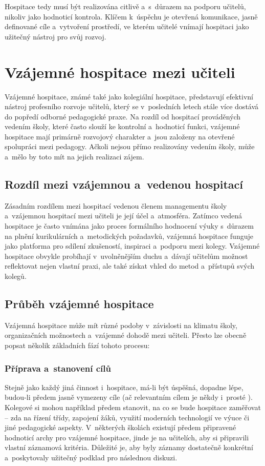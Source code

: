 Hospitace tedy musí být realizována citlivě a~s~důrazem na podporu učitelů, nikoliv jako hodnoticí kontrola. Klíčem k~úspěchu je otevřená komunikace, jasně definované cíle a~vytvoření prostředí, ve kterém učitelé vnímají hospitaci jako užitečný nástroj pro svůj rozvoj.

\section{Vzájemné hospitace mezi učiteli}
Vzájemné hospitace, známé také jako kolegiální hospitace, představují efektivní nástroj profesního rozvoje učitelů, který se v~posledních letech stále více dostává do popředí odborné pedagogické praxe. Na rozdíl od hospitací prováděných vedením školy, které často slouží ke kontrolní a~hodnoticí funkci, vzájemné hospitace mají primárně rozvojový charakter a~jsou založeny na otevřené spolupráci mezi pedagogy. Ačkoli nejsou přímo realizovány vedením školy, může a~mělo by toto mít na jejich realizaci zájem.

\subsection{Rozdíl mezi vzájemnou a~vedenou hospitací}
Zásadním rozdílem mezi hospitací vedenou členem managementu školy a~vzájemnou hospitací mezi učiteli je její účel a~atmosféra. Zatímco vedená hospitace je často vnímána jako proces formálního hodnocení výuky s~důrazem na plnění kurikulárních a~metodických požadavků, vzájemná hospitace funguje jako platforma pro sdílení zkušeností, inspiraci a~podporu mezi kolegy. Vzájemné hospitace obvykle probíhají v~uvolněnějším duchu a~dávají učitelům možnost reflektovat nejen vlastní praxi, ale také získat vhled do metod a~přístupů svých kolegů.

\subsection{Průběh vzájemné hospitace}
Vzájemná hospitace může mít různé podoby v~závislosti na klimatu školy, organizačních možnostech a~vzájemné dohodě mezi učiteli. Přesto lze obecně popsat několik základních fází tohoto procesu:

\subsubsection{Příprava a~stanovení cílů}
Stejně jako každý jiná činnost i~hospitace, má-li být úspěšná, dopadne lépe, budou-li předem jasně vymezeny cíle (ač relevantním cílem je někdy i~prosté ). Kolegové si mohou například předem stanovit, na co se bude hospitace zaměřovat – zda na řízení třídy, zapojení žáků, využití moderních technologií ve výuce či jiné pedagogické aspekty. V~některých školách existují předem připravené hodnoticí archy pro vzájemné hospitace, jinde je na učitelích, aby si připravili vlastní záznamová kritéria. Důležité je, aby byly záznamy dostatečně konkrétní a~poskytovaly užitečný podklad pro následnou diskuzi.

